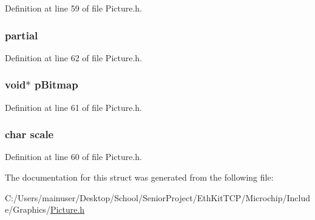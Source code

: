 Definition at line 59 of file Picture.\+h.

\hypertarget{struct_p_i_c_t_u_r_e_a38f3573025aa3c79b8d7091d9e62f8e2}{}
\subsubsection[{partial}]{ partial}\label{struct_p_i_c_t_u_r_e_a38f3573025aa3c79b8d7091d9e62f8e2}


Definition at line 62 of file Picture.\+h.

\hypertarget{struct_p_i_c_t_u_r_e_aef9bed8e1a29e17226ccbd9a3d81f9e1}{}
\subsubsection[{p\+Bitmap}]{\setlength{\rightskip}{0pt plus 5cm}void$\ast$ p\+Bitmap}\label{struct_p_i_c_t_u_r_e_aef9bed8e1a29e17226ccbd9a3d81f9e1}


Definition at line 61 of file Picture.\+h.

\hypertarget{struct_p_i_c_t_u_r_e_aa4b3424dc0de08bfe8f637d736c39d31}{}
\subsubsection[{scale}]{\setlength{\rightskip}{0pt plus 5cm}char scale}\label{struct_p_i_c_t_u_r_e_aa4b3424dc0de08bfe8f637d736c39d31}


Definition at line 60 of file Picture.\+h.



The documentation for this struct was generated from the following file\+:\begin{DoxyCompactItemize}
\item 
C\+:/\+Users/mainuser/\+Desktop/\+School/\+Senior\+Project/\+Eth\+Kit\+T\+C\+P/\+Microchip/\+Include/\+Graphics/\hyperlink{_picture_8h}{Picture.\+h}\end{DoxyCompactItemize}
